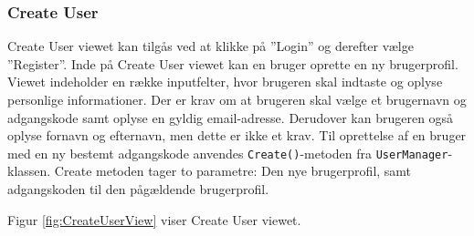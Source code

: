 \subsubsection{Create User}

Create User viewet kan tilgås ved at klikke på ''Login'' og derefter vælge ''Register''. Inde på Create User viewet kan en bruger oprette en ny brugerprofil. Viewet indeholder en række inputfelter, hvor brugeren skal indtaste og oplyse personlige informationer. Der er krav om at brugeren skal vælge et brugernavn og adgangskode samt oplyse en gyldig email-adresse. Derudover kan brugeren også oplyse fornavn og efternavn, men dette er ikke et krav. 
Til oprettelse af en bruger med en ny bestemt adgangskode anvendes \verb+Create()+-metoden fra \verb+UserManager+-klassen. Create metoden tager to parametre: Den nye brugerprofil, samt adgangskoden til den pågældende brugerprofil. 

Figur \ref{fig:CreateUserView} viser Create User viewet. 

